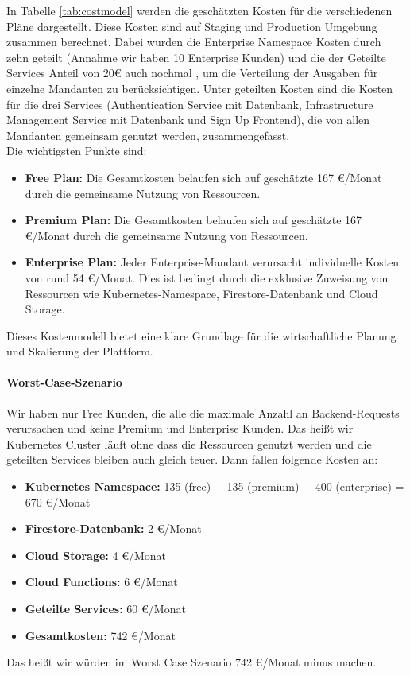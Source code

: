 In Tabelle \ref{tab:costmodel} werden die geschätzten Kosten für die verschiedenen Pläne dargestellt.
Diese Kosten sind auf Staging und Production Umgebung zusammen berechnet.
Dabei wurden die Enterprise Namespace Kosten durch zehn geteilt (Annahme wir haben 10 Enterprise Kunden) und die der Geteilte Services Anteil von 20€ auch nochmal , um die Verteilung der Ausgaben für einzelne Mandanten zu berücksichtigen.
Unter geteilten Kosten sind die Kosten für die drei Services (Authentication Service mit Datenbank, Infrastructure Management Service mit Datenbank und Sign Up Frontend), die von allen Mandanten gemeinsam genutzt werden, zusammengefasst.
\\
Die wichtigsten Punkte sind:
\begin{itemize}
	\item \textbf{Free Plan:} Die Gesamtkosten belaufen sich auf geschätzte 167 €/Monat durch die gemeinsame Nutzung von Ressourcen.
	\item \textbf{Premium Plan:} Die Gesamtkosten belaufen sich auf geschätzte 167 €/Monat durch die gemeinsame Nutzung von Ressourcen.
	\item \textbf{Enterprise Plan:} Jeder Enterprise-Mandant verursacht individuelle Kosten von rund 54 €/Monat. Dies ist bedingt durch die exklusive Zuweisung von Ressourcen wie Kubernetes-Namespace, Firestore-Datenbank und Cloud Storage.
\end{itemize}

Dieses Kostenmodell bietet eine klare Grundlage für die wirtschaftliche Planung und Skalierung der Plattform.

\paragraph{Worst-Case-Szenario}
Wir haben nur Free Kunden, die alle die maximale Anzahl an Backend-Requests verursachen und keine Premium und Enterprise Kunden.
Das heißt wir Kubernetes Cluster läuft ohne dass die Ressourcen genutzt werden und die geteilten Services bleiben auch gleich teuer.
Dann fallen folgende Kosten an:
\begin{itemize}
	\item \textbf{Kubernetes Namespace:} 135 (free) + 135 (premium) + 400 (enterprise) = 670 €/Monat
	\item \textbf{Firestore-Datenbank:} 2 €/Monat
	\item \textbf{Cloud Storage:} 4 €/Monat
	\item \textbf{Cloud Functions:} 6 €/Monat
	\item \textbf{Geteilte Services:} 60 €/Monat
	\item \textbf{Gesamtkosten:} 742 €/Monat
\end{itemize}
Das heißt wir würden im Worst Case Szenario 742 €/Monat minus machen.

